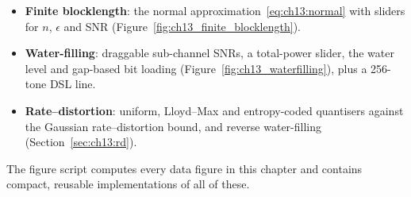 \begin{labbox}
\begin{itemize}
\item \textbf{Finite blocklength}: the normal approximation~\eqref{eq:ch13:normal} with sliders for
$n$, $\epsilon$ and SNR (Figure~\ref{fig:ch13_finite_blocklength}).
\item \textbf{Water-filling}: draggable sub-channel SNRs, a total-power slider, the water level and
gap-based bit loading (Figure~\ref{fig:ch13_waterfilling}), plus a 256-tone DSL line.
\item \textbf{Rate--distortion}: uniform, Lloyd--Max and entropy-coded quantisers against the
Gaussian rate--distortion bound, and reverse water-filling (Section~\ref{sec:ch13:rd}).
\end{itemize}
The figure script  computes every data figure in this chapter and
contains compact, reusable implementations of all of these.
\end{labbox}

